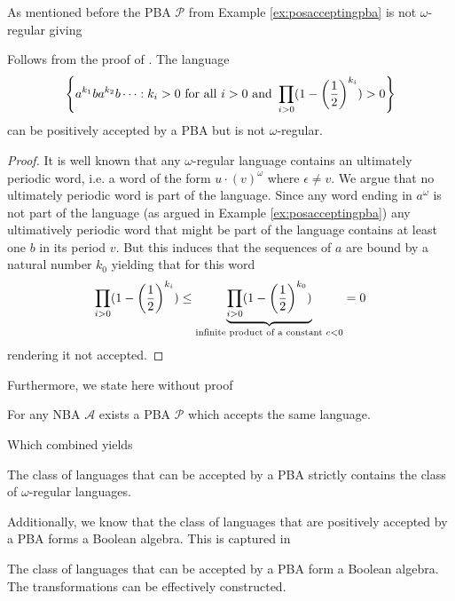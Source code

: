 As mentioned before the \ac{PBA} $\mathcal{P}$ from Example 
\ref{ex:posacceptingpba} is not $\omega$-regular giving
\begin{lemma}
  Follows from the proof of \cite[Theorem 4]{RecOmeLangProbAuto}.
  The language
  \begin{equation*}
    \left\{a^{k_{1}}ba^{k_{2}}b\dots:k_{i}>0\text{ for all }i>0\text{ and }
    \prod_{i>0}(1-\left(\frac{1}{2}\right)^{k_{i}}) > 0\right\}
  \end{equation*}
  can be positively accepted by a \ac{PBA} but is not $\omega$-regular.
  \label{lem:posaccpba>omegareg}
\end{lemma}
\begin{proof}
  It is well known that any $\omega$-regular language contains an ultimately
  periodic word, i.e. a word of the form $u\cdot (v)^{\omega}$ where 
  $\epsilon\neq v$. We argue that no ultimately periodic word is part of the
  language. Since any word ending in $a^{\omega}$ is not part of the language
  (as argued in Example \ref{ex:posacceptingpba}) any ultimatively periodic
  word that might be part of the language contains at least one $b$ in its
  period $v$. But this induces that the sequences of $a$ are bound by a natural
  number $k_{0}$ yielding that for this word
  \begin{equation*}
    \prod_{i>0}(1-\left(\frac{1}{2}\right)^{k_{i}}) \leq
    \underbrace{\prod_{i>0}(1-\left(\frac{1}{2}\right)^{k_{0}})}_{
      \text{infinite product of a constant }c<0} = 0
  \end{equation*}
  rendering it not accepted.
\end{proof}
Furthermore, we state here without proof
\begin{lemma}
  \cite[Lemma 5]{RecOmeLangProbAuto} For any \ac{NBA} $\mathcal{A}$ exists a
  \ac{PBA} $\mathcal{P}$ which accepts the same language.
\end{lemma}
Which combined yields
\begin{theorem}
  \cite[Theorem 4]{RecOmeLangProbAuto}
  The class of languages that can be accepted by a \ac{PBA} strictly contains
  the class of $\omega$-regular languages.
\end{theorem}
Additionally, we know that the class of languages that are positively accepted 
by a \ac{PBA} forms a Boolean algebra. This is captured in
\begin{theorem}
  \cite[Chapter 4.3.]{Groesser}
  The class of languages that can be accepted by a \ac{PBA} form a Boolean 
  algebra. The transformations can be effectively constructed.
  \label{thm:pbaboolalgebra}
\end{theorem}
